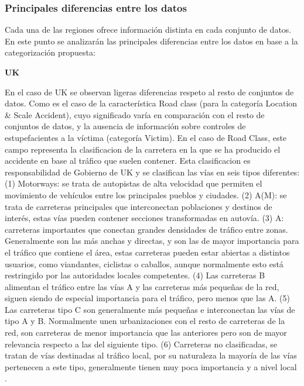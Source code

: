 \documentclass{uathesis-es}
\begin{document}
{\subsubsection*{Principales diferencias entre los datos}

Cada una de las regiones ofrece información distinta en cada conjunto de datos. En este punto se analizarán las principales diferencias entre los datos en base a la categorización propuesta:

\textbf{UK}

En el caso de UK se observan ligeras diferencias respeto al resto de conjuntos de datos. Como es el caso de la característica Road class (para la categoría Location \& Scale Accident), cuyo significado varía en comparación con el resto de conjuntos de datos, y la ausencia de información sobre controles de estupefacientes a la víctima (categoría Victim). En el caso de Road Class, este campo representa la clasificacion de la carretera en la que se ha producido el accidente en base al tráfico que suelen contener. Esta clasificacion es responsabilidad de Gobierno de UK y se clasifican las vías en seis tipos diferentes: (1) Motorways: se trata de autopistas de alta velocidad que permiten el movimiento de vehículos entre los principales pueblos y ciudades. (2) A(M): se trata de carreteras principales que interconectan poblaciones y destinos de interés, estas vías pueden contener secciones transformadas en autovía. (3) A: carreteras importantes que conectan grandes densidades de tráfico entre zonas. Generalmente son las más anchas y directas, y son las de mayor importancia para el tráfico que contiene el área, estas carreteras pueden estar abiertas a distintos usuarios, como viandantes, ciclistas o caballos, aunque normalmente esto está restringido por las autoridades locales competentes. (4) Las carreteras B alimentan el tráfico entre las vías A y las carreteras más pequeñas de la red, siguen siendo de especial importancia para el tráfico, pero menos que las A. (5) Las carreteras tipo C son generalmente más pequeñas e interconectan las vías de tipo A y B. Normalmente unen urbanizaciones con el resto de carreteras de la red, son carreteras de menor importancia que las anteriores pero son de mayor relevancia respecto a las del siguiente tipo. (6) Carreteras no clasificadas, se tratan de vías destinadas al tráfico local, por su naturaleza la mayoría de las vías pertenecen a este tipo, generalmente tienen muy poca importancia y a nivel local \cite{UKDepartmentForTransportRoadClassification}.


}
\end{document}
